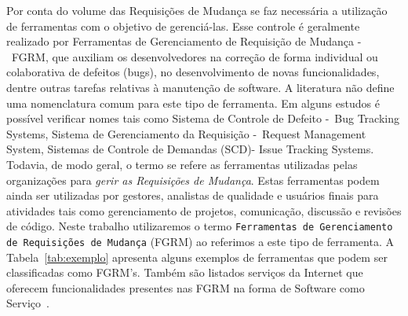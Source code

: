 Por conta do volume das Requisições de Mudança se faz necessária a utilização de
ferramentas com o objetivo de gerenciá-las. Esse controle é geralmente
realizado por Ferramentas de Gerenciamento de Requisição de Mudança -~FGRM, que auxiliam os
desenvolvedores na correção de forma individual ou colaborativa de defeitos (bugs), no
desenvolvimento de novas funcionalidades, dentre outras tarefas relativas à manutenção de software.
A literatura não define uma nomenclatura comum para este tipo de ferramenta. Em alguns estudos é
possível verificar nomes tais como Sistema de Controle de Defeito -~Bug Tracking Systems, Sistema de
Gerenciamento da Requisição -~Request Management System, Sistemas de Controle de Demandas (SCD)-
Issue Tracking Systems. Todavia, de modo geral, o termo se refere as
ferramentas utilizadas pelas organizações para \textit{gerir as Requisições de Mudança}. Estas
ferramentas podem ainda ser utilizadas por gestores, analistas de qualidade e usuários finais para
atividades tais como gerenciamento de projetos, comunicação, discussão e revisões de código. Neste
trabalho utilizaremos o termo \texttt{Ferramentas de Gerenciamento de Requisições de Mudança} (FGRM)
ao referimos a este tipo de ferramenta.  A Tabela~\ref{tab:exemplo} apresenta alguns exemplos de
ferramentas que podem ser classificadas como FGRM's. Também são listados serviços da Internet que
oferecem funcionalidades presentes nas FGRM na forma de Software como
Serviço~\cite{fox2013engineering}.

\begin{table}[ht]
	\centering
	\caption{Exemplos de ferramentas e serviços da Internet. Adaptado de~\cite{cavalcanti2014challenges}}\label{tab:exemplo}
\end{table}


